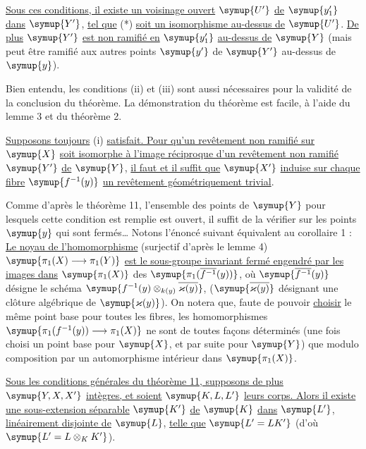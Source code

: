 \uline{Sous ces conditions, il existe un voisinage ouvert} $\symup{U'}$
\uline{de} $\symup{y'_1}$
\uline{dans} $\symup{Y'}$, \uline{tel que} (*) \uline{soit un isomorphisme au-dessus de} $\symup{U'}$. \uline{De
plus} $\symup{Y'}$ \uline{est non ramifié en} $\symup{y'_1}$ \uline{au-dessus de} $\symup{Y}$ (mais peut être ramifié
aux autres points $\symup{y'}$ de $\symup{Y'}$ au-dessus de $\symup{y}$).

Bien entendu, les conditions (ii) et (iii) sont aussi
nécessaires pour la validité de la conclusion du théorème. La démonstration du
théorème est facile, à l'aide du lemme 3 et du théorème 2.

 \uline{Supposons toujours} (i) \uline{satisfait. Pour qu'un
revêtement non ramifié sur} $\symup{X}$ \uline{soit isomorphe à l'image réciproque d'un
revêtement non ramifié} $\symup{Y'}$ \uline{de} $\symup{Y}$, \uline{il faut et il suffit que} $\symup{X'}$ \uline{induise sur
chaque fibre} $\symup{f^{-1}(y)}$ \uline{un revêtement géométriquement trivial}.

Comme d'après le théorème 11, l'ensemble des points de $\symup{Y}$ pour lesquels cette
condition est remplie est ouvert, il suffit de la vérifier sur les points $\symup{y}$
qui sont fermés\ldots{} Notons l'énoncé suivant équivalent au corollaire 1 : \uline{Le
noyau de l'homomorphisme} (surjectif d'après le lemme 4)
$\symup{\pi_1(X)\longrightarrow\pi_1(Y)}$ \uline{est le sous-groupe invariant fermé engendré
par les images dans} $\symup{\pi_1(X)}$ des $\symup{\pi_1(\overline{f^{-1}}(y))}$, où
$\symup{\overline{f^{-1}}(y)}$ désigne le schéma
$\symup{f^{-1}(y)\otimes_{k(y)}\overline{\varkappa(y)}}$,
($\symup{\overline{\varkappa(y)}}$ désignant une clôture algébrique de $\symup{\varkappa(y)}$). On
notera que, faute de pouvoir \uline{choisir} le même point base pour toutes les fibres,
les homomorphismes $\symup{\pi_1(f^{-1}(y))\longrightarrow\pi_1(X)}$ ne sont
de toutes façons déterminés (une fois choisi un point base pour $\symup{X}$, et par
suite pour $\symup{Y}$) que modulo composition par un automorphisme intérieur dans
$\symup{\pi_1(X)}$.

 \uline{Sous les conditions générales du théorème 11, supposons
de plus} $\symup{Y,X,X'}$ \uline{intègres, et soient} $\symup{K,L,L'}$ \uline{leurs corps. Alors il existe une
sous-extension séparable} $\symup{K'}$ \uline{de} $\symup{K}$ \uline{dans} $\symup{L'}$, \uline{linéairement disjointe de} $\symup{L}$,
\uline{telle que} $\symup{L'=LK'}$ (d'où $\symup{L'=L\otimes_K K'}$).

